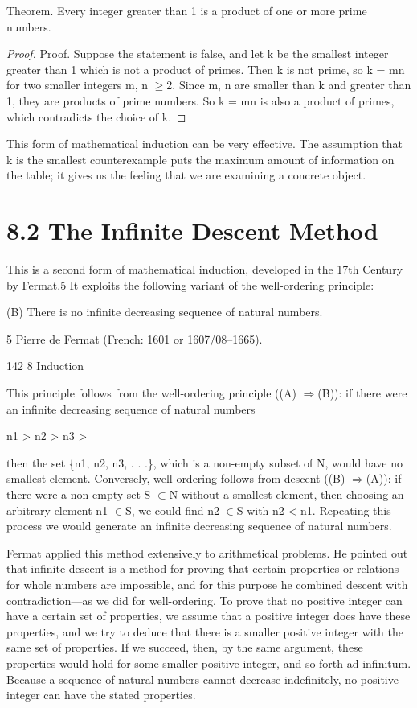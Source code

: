 \documentclass[11pt]{article}
\theoremstyle{plain}
\theoremstyle{definition}
\begin{document}
Theorem. Every integer greater than 1 is a product of one or more prime numbers.

\begin{proof}
Proof. Suppose the statement is false, and let k be the smallest integer greater than 1 which is not a product of primes. Then k is not prime, so k = mn for two smaller integers m, n $\geq$2. Since m, n are smaller than k and greater than 1, they are products of prime numbers. So k = mn is also a product of primes, which contradicts the choice of k. 
\end{proof}

This form of mathematical induction can be very effective. The assumption that k is the smallest counterexample puts the maximum amount of information on the table; it gives us the feeling that we are examining a concrete object.

\section{8.2 The Infinite Descent Method}

This is a second form of mathematical induction, developed in the 17th Century by Fermat.5 It exploits the following variant of the well-ordering principle:

(B) There is no infinite decreasing sequence of natural numbers.

5 Pierre de Fermat (French: 1601 or 1607/08--1665).

142 8 Induction

This principle follows from the well-ordering principle ((A) $\Rightarrow$(B)): if there were an infinite decreasing sequence of natural numbers

n1 > n2 > n3 > \textperiodcentered{} \textperiodcentered{} \textperiodcentered{}

then the set \{n1, n2, n3, . . .\}, which is a non-empty subset of N, would have no smallest element. Conversely, well-ordering follows from descent ((B) $\Rightarrow$(A)): if there were a non-empty set S $\subset$N without a smallest element, then choosing an arbitrary element n1 $\in$S, we could find n2 $\in$S with n2 < n1. Repeating this process we would generate an infinite decreasing sequence of natural numbers.

Fermat applied this method extensively to arithmetical problems. He pointed out that infinite descent is a method for proving that certain properties or relations for whole numbers are impossible, and for this purpose he combined descent with contradiction---as we did for well-ordering. To prove that no positive integer can have a certain set of properties, we assume that a positive integer does have these properties, and we try to deduce that there is a smaller positive integer with the same set of properties. If we succeed, then, by the same argument, these properties would hold for some smaller positive integer, and so forth ad infinitum. Because a sequence of natural numbers cannot decrease indefinitely, no positive integer can have the stated properties.
\end{document}
